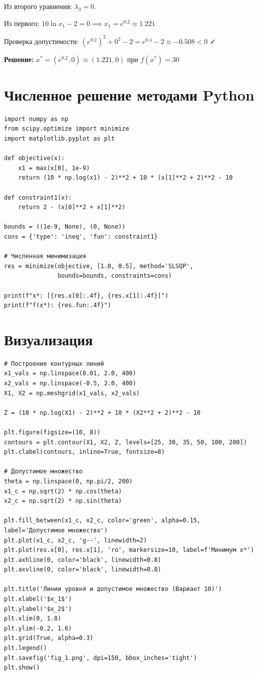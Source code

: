 \documentclass[a4paper,12pt]{article}
\begin{document}
Из второго уравнения: $\lambda_3 = 0$.

Из первого: $10\ln x_1 - 2 = 0 \implies x_1 = e^{0.2} \approx 1.221$

Проверка допустимости: $(e^{0.2})^2 + 0^2 - 2 = e^{0.4} - 2 \approx -0.508 < 0$ ✓

\textbf{Решение:} $x^* = (e^{0.2}, 0) \approx (1.221, 0)$ при $f(x^*) = 30$

\section*{Численное решение методами Python}

\begin{lstlisting}
import numpy as np
from scipy.optimize import minimize
import matplotlib.pyplot as plt

def objective(x):
    x1 = max(x[0], 1e-9)
    return (10 * np.log(x1) - 2)**2 + 10 * (x[1]**2 + 2)**2 - 10

def constraint1(x):
    return 2 - (x[0]**2 + x[1]**2)

bounds = ((1e-9, None), (0, None))
cons = {'type': 'ineq', 'fun': constraint1}

# Численная минимизация
res = minimize(objective, [1.0, 0.5], method='SLSQP', 
               bounds=bounds, constraints=cons)

print(f"x*: [{res.x[0]:.4f}, {res.x[1]:.4f}]")
print(f"f(x*): {res.fun:.4f}")
\end{lstlisting}

\section*{Визуализация}

\begin{lstlisting}
# Построение контурных линий
x1_vals = np.linspace(0.01, 2.0, 400)
x2_vals = np.linspace(-0.5, 2.0, 400)
X1, X2 = np.meshgrid(x1_vals, x2_vals)

Z = (10 * np.log(X1) - 2)**2 + 10 * (X2**2 + 2)**2 - 10

plt.figure(figsize=(10, 8))
contours = plt.contour(X1, X2, Z, levels=[25, 30, 35, 50, 100, 200])
plt.clabel(contours, inline=True, fontsize=8)

# Допустимое множество
theta = np.linspace(0, np.pi/2, 200)
x1_c = np.sqrt(2) * np.cos(theta)
x2_c = np.sqrt(2) * np.sin(theta)

plt.fill_between(x1_c, x2_c, color='green', alpha=0.15, label='Допустимое множество')
plt.plot(x1_c, x2_c, 'g--', linewidth=2)
plt.plot(res.x[0], res.x[1], 'ro', markersize=10, label=f'Минимум x*')
plt.axhline(0, color='black', linewidth=0.8)
plt.axvline(0, color='black', linewidth=0.8)

plt.title('Линии уровня и допустимое множество (Вариант 10)')
plt.xlabel('$x_1$')
plt.ylabel('$x_2$')
plt.xlim(0, 1.8)
plt.ylim(-0.2, 1.6)
plt.grid(True, alpha=0.3)
plt.legend()
plt.savefig('fig_1.png', dpi=150, bbox_inches='tight')
plt.show()
\end{lstlisting}
\end{document}
